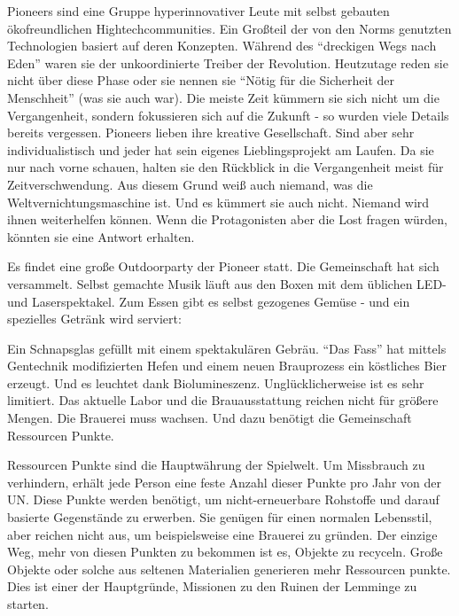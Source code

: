 \begin{sidebarBox}[title=Pioneers]
Pioneers sind eine Gruppe hyperinnovativer Leute mit selbst gebauten ökofreundlichen Hightechcommunities. Ein Großteil der von den Norms genutzten Technologien basiert auf deren Konzepten. Während des \enquote{dreckigen Wegs nach Eden} waren sie der unkoordinierte Treiber der Revolution. Heutzutage reden sie nicht über diese Phase oder sie nennen sie \enquote{Nötig für die Sicherheit der Menschheit} (was sie auch war). Die meiste Zeit kümmern sie sich nicht um die Vergangenheit, sondern fokussieren sich auf die Zukunft - so wurden viele Details bereits vergessen. Pioneers lieben ihre kreative Gesellschaft. Sind aber sehr individualistisch und jeder hat sein eigenes Lieblingsprojekt am Laufen. Da sie nur nach vorne schauen, halten sie den Rückblick in die Vergangenheit meist für Zeitverschwendung. Aus diesem Grund weiß auch niemand, was die Weltvernichtungsmaschine ist. Und es kümmert sie auch nicht. Niemand wird ihnen weiterhelfen können. Wenn die Protagonisten aber die Lost fragen würden, könnten sie eine Antwort erhalten.
\end{sidebarBox}

Es findet eine große Outdoorparty der Pioneer statt. Die Gemeinschaft hat sich versammelt. Selbst gemachte Musik läuft aus den Boxen mit dem üblichen LED- und Laserspektakel. Zum Essen gibt es selbst gezogenes Gemüse - und ein spezielles Getränk wird serviert:

Ein Schnapsglas gefüllt mit einem spektakulären Gebräu. \enquote{Das Fass} hat mittels Gentechnik modifizierten Hefen und einem neuen Brauprozess ein köstliches Bier erzeugt. Und es leuchtet dank Biolumineszenz. Unglücklicherweise ist es sehr limitiert. Das aktuelle Labor und die Brauausstattung reichen nicht für größere Mengen. Die Brauerei muss wachsen. Und dazu benötigt die Gemeinschaft Ressourcen Punkte.

\begin{sidebarBox}[title=Ressourcen Punkte]
Ressourcen Punkte sind die Hauptwährung der Spielwelt. Um Missbrauch zu verhindern, erhält jede Person eine feste Anzahl dieser Punkte pro Jahr von der UN. Diese Punkte werden benötigt, um nicht-erneuerbare Rohstoffe und darauf basierte Gegenstände zu erwerben. Sie genügen für einen normalen Lebensstil, aber reichen nicht aus, um beispielsweise eine Brauerei zu gründen. Der einzige Weg, mehr von diesen Punkten zu bekommen ist es, Objekte zu recyceln. Große Objekte oder solche aus seltenen Materialien generieren mehr Ressourcen punkte. Dies ist einer der Hauptgründe, Missionen zu den Ruinen der Lemminge zu starten.
\end{sidebarBox}

